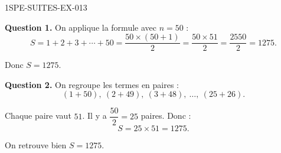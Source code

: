 \begin{corrige}{1SPE-SUITES-EX-013}


\textbf{Question 1.} On applique la formule avec $n = 50$ :
\[
S = 1 + 2 + 3 + \cdots + 50 = \frac{50 \times (50 + 1)}{2} = \frac{50 \times 51}{2} = \frac{2550}{2} = 1275.
\]

Donc $S = 1275$.


\textbf{Question 2.} On regroupe les termes en paires :
\[
(1 + 50),\ (2 + 49),\ (3 + 48),\ \ldots,\ (25 + 26).
\]

Chaque paire vaut $51$. Il y a $\dfrac{50}{2} = 25$ paires. Donc :
\[
S = 25 \times 51 = 1275.
\]

On retrouve bien $S = 1275$. \checkmark

\end{corrige}
